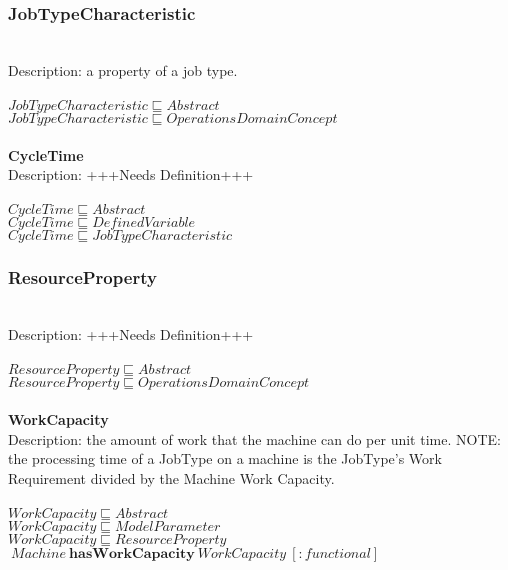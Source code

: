 \subsubsection{JobTypeCharacteristic}\\
Description: a property of a job type.\\
\\$ JobTypeCharacteristic \sqsubseteq Abstract$
\\$ JobTypeCharacteristic \sqsubseteq OperationsDomainConcept$
\\\\   \textbf{CycleTime}\\Description: +++Needs Definition+++\\
\\$ CycleTime \sqsubseteq Abstract$
\\$ CycleTime \sqsubseteq DefinedVariable$
\\$ CycleTime \sqsubseteq JobTypeCharacteristic$
\subsubsection{ResourceProperty}\\
Description: +++Needs Definition+++\\
\\$ ResourceProperty \sqsubseteq Abstract$
\\$ ResourceProperty \sqsubseteq OperationsDomainConcept$
\\\\   \textbf{WorkCapacity}\\Description: the amount of work that the machine can do per unit time. NOTE: the processing time of a JobType on a machine is the JobType's Work Requirement divided by the Machine Work Capacity.\\
\\$ WorkCapacity \sqsubseteq Abstract$
\\$ WorkCapacity \sqsubseteq ModelParameter$
\\$ WorkCapacity \sqsubseteq ResourceProperty$
\\$\: Machine\: \textbf{hasWorkCapacity}\: WorkCapacity\:  [:functional]$
